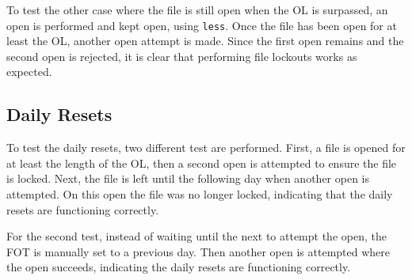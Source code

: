 To test the other case where the file is still open when the OL is surpassed, an open is performed and kept open, using \texttt{less}. Once the file has been open for at least the OL, another open attempt is made. Since the first open remains and the second open is rejected, it is clear that performing file lockouts works as expected.

\subsection{Daily Resets}

To test the daily resets, two different test are performed. First, a file is opened for at least the length of the OL, then a second open is attempted to ensure the file is locked. Next, the file is left until the following day when another open is attempted. On this open the file was no longer locked, indicating that the daily resets are functioning correctly.

For the second test, instead of waiting until the next to attempt the open, the FOT is manually set to a previous day. Then another open is attempted where the open succeeds, indicating the daily resets are functioning correctly.